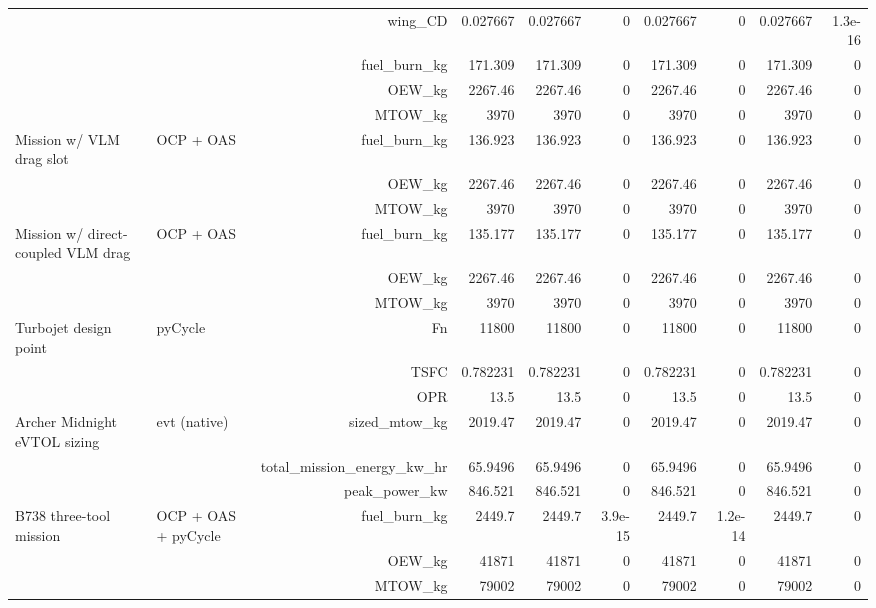 \begin{tabular}{llrrrrrrrr}
 &  & wing\_CD & 0.027667 & 0.027667 & 0 & 0.027667 & 0 & 0.027667 & 1.3e-16 \\
 &  & fuel\_burn\_kg & 171.309 & 171.309 & 0 & 171.309 & 0 & 171.309 & 0 \\
 &  & OEW\_kg & 2267.46 & 2267.46 & 0 & 2267.46 & 0 & 2267.46 & 0 \\
 &  & MTOW\_kg & 3970 & 3970 & 0 & 3970 & 0 & 3970 & 0 \\
\addlinespace
Mission w/ VLM drag slot & OCP + OAS & fuel\_burn\_kg & 136.923 & 136.923 & 0 & 136.923 & 0 & 136.923 & 0 \\
 &  & OEW\_kg & 2267.46 & 2267.46 & 0 & 2267.46 & 0 & 2267.46 & 0 \\
 &  & MTOW\_kg & 3970 & 3970 & 0 & 3970 & 0 & 3970 & 0 \\
\addlinespace
Mission w/ direct-coupled VLM drag & OCP + OAS & fuel\_burn\_kg & 135.177 & 135.177 & 0 & 135.177 & 0 & 135.177 & 0 \\
 &  & OEW\_kg & 2267.46 & 2267.46 & 0 & 2267.46 & 0 & 2267.46 & 0 \\
 &  & MTOW\_kg & 3970 & 3970 & 0 & 3970 & 0 & 3970 & 0 \\
\addlinespace
Turbojet design point & pyCycle & Fn & 11800 & 11800 & 0 & 11800 & 0 & 11800 & 0 \\
 &  & TSFC & 0.782231 & 0.782231 & 0 & 0.782231 & 0 & 0.782231 & 0 \\
 &  & OPR & 13.5 & 13.5 & 0 & 13.5 & 0 & 13.5 & 0 \\
\addlinespace
Archer Midnight eVTOL sizing & evt (native) & sized\_mtow\_kg & 2019.47 & 2019.47 & 0 & 2019.47 & 0 & 2019.47 & 0 \\
 &  & total\_mission\_energy\_kw\_hr & 65.9496 & 65.9496 & 0 & 65.9496 & 0 & 65.9496 & 0 \\
 &  & peak\_power\_kw & 846.521 & 846.521 & 0 & 846.521 & 0 & 846.521 & 0 \\
\addlinespace
B738 three-tool mission & OCP + OAS + pyCycle & fuel\_burn\_kg & 2449.7 & 2449.7 & 3.9e-15 & 2449.7 & 1.2e-14 & 2449.7 & 0 \\
 &  & OEW\_kg & 41871 & 41871 & 0 & 41871 & 0 & 41871 & 0 \\
 &  & MTOW\_kg & 79002 & 79002 & 0 & 79002 & 0 & 79002 & 0 \\
\bottomrule
\end{tabular}
